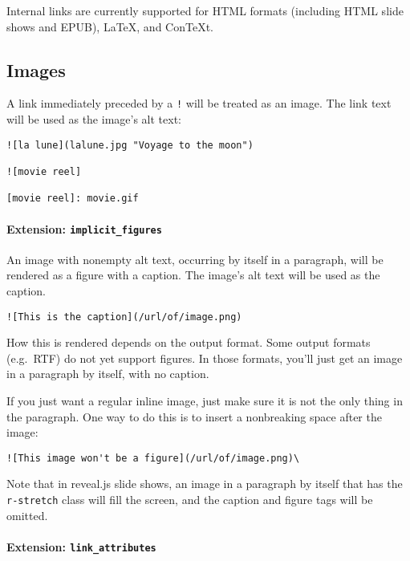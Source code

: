 \documentclass[
  a4paper,
]{article}
\begin{document}
Internal links are currently supported for HTML formats (including HTML
slide shows and EPUB), LaTeX, and ConTeXt.

\hypertarget{images}{%
\subsection{Images}\label{images}}

A link immediately preceded by a \texttt{!} will be treated as an image.
The link text will be used as the image's alt text:

\begin{verbatim}
![la lune](lalune.jpg "Voyage to the moon")

![movie reel]

[movie reel]: movie.gif
\end{verbatim}

\hypertarget{extension-implicit_figures}{%
\paragraph{\texorpdfstring{Extension:
\texttt{implicit\_figures}}{Extension: implicit\_figures}}\label{extension-implicit_figures}}

An image with nonempty alt text, occurring by itself in a paragraph,
will be rendered as a figure with a caption. The image's alt text will
be used as the caption.

\begin{verbatim}
![This is the caption](/url/of/image.png)
\end{verbatim}

How this is rendered depends on the output format. Some output formats
(e.g.~RTF) do not yet support figures. In those formats, you'll just get
an image in a paragraph by itself, with no caption.

If you just want a regular inline image, just make sure it is not the
only thing in the paragraph. One way to do this is to insert a
nonbreaking space after the image:

\begin{verbatim}
![This image won't be a figure](/url/of/image.png)\
\end{verbatim}

Note that in reveal.js slide shows, an image in a paragraph by itself
that has the \texttt{r-stretch} class will fill the screen, and the
caption and figure tags will be omitted.

\hypertarget{extension-link_attributes}{%
\paragraph{\texorpdfstring{Extension:
\texttt{link\_attributes}}{Extension: link\_attributes}}\label{extension-link_attributes}}
\end{document}
